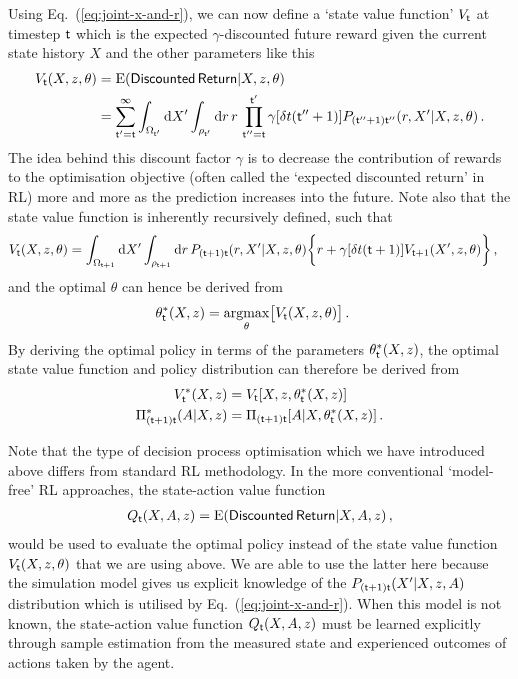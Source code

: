 Using Eq.~(\ref{eq:joint-x-and-r}), we can now define a `state value function' $V_{{\sf t}}$ at timestep ${\sf t}$ which is the expected $\gamma$-discounted future reward given the current state history $X$ and the other parameters like this
\begin{align}
V_{{\sf t}}(X,z,\theta) &= {\rm E}({\sf Discounted \,Return}\vert X, z, \theta ) \nonumber \\
&= \sum_{{\sf t}'={\sf t}}^{\infty} \int_{\Omega_{{\sf t}'}}{\rm d}X'\int_{\rho_{{\sf t}'}} {\rm d}r \,r\, \prod_{{\sf t}''={\sf t}}^{{\sf t}'} \gamma [\delta t({\sf t}''+1)]P_{({\sf t}''+1){\sf t}''}(r,X'\vert X, z,\theta) \,.
\end{align}
The idea behind this discount factor $\gamma$ is to decrease the contribution of rewards to the optimisation objective (often called the `expected discounted return' in RL) more and more as the prediction increases into the future. Note also that the state value function is inherently recursively defined, such that
\begin{align}
V_{{\sf t}}(X,z,\theta) &= \int_{\Omega_{{\sf t}+1}}{\rm d}X'\int_{\rho_{{\sf t}+1}} {\rm d}r \, P_{({\sf t}+1){\sf t}}(r,X'\vert X, z,\theta)\bigg\{ r+\gamma [\delta t({\sf t}+1)]V_{{\sf t}+1}(X',z,\theta)\bigg\} \,,
\end{align}
and the optimal $\theta$ can hence be derived from
\begin{align}
\theta^*_{{\sf t}}(X,z) &= \underset{\theta}{{\rm argmax}} \big[ V_{{\sf t}}(X,z,\theta)\big] \,.
\end{align}
By deriving the optimal policy in terms of the parameters $\theta^*_{{\sf t}}(X,z)$, the optimal state value function and policy distribution can therefore be derived from
\begin{align}
V^*_{{\sf t}}(X,z) &= V_{{\sf t}}[X,z,\theta^*_{{\sf t}}(X,z)] \\
\Pi^*_{({\sf t}+1){\sf t}}(A\vert X,z) &= \Pi_{({\sf t}+1){\sf t}}[A\vert X,\theta^*_{{\sf t}}(X,z)] \,.
\end{align}

Note that the type of decision process optimisation which we have introduced above differs from standard RL methodology. In the more conventional `model-free' RL approaches, the state-action value function 
\begin{align}
Q_{{\sf t}}(X,A,z)={\rm E}({\sf Discounted \,Return}\vert X,A,z) \,,
\end{align}
would be used to evaluate the optimal policy instead of the state value function $V_{{\sf t}}(X,z,\theta )$ that we are using above. We are able to use the latter here because the simulation model gives us explicit knowledge of the $P_{({\sf t}+1){\sf t}}(X'\vert X,z,A)$ distribution which is utilised by Eq.~(\ref{eq:joint-x-and-r}). When this model is not known, the state-action value function $Q_{{\sf t}}(X,A,z)$ must be learned explicitly through sample estimation from the measured state and experienced outcomes of actions taken by the agent.

